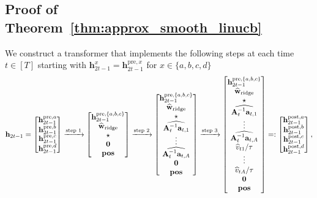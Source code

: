 \documentclass[10pt]{article}
\renewcommand{\hat}{\widehat}
\newcommand{\<}{\left\langle}
\renewcommand{\>}{\right\rangle}
\newcommand{\bzero}{{\mathbf 0}}
\newcommand{\ridge}{{\rm ridge}}
\newcommand{\pre}{{\mathrm{pre}}}
\newcommand{\posv}{{\mathbf{pos}}}
\newcommand{\post}{{\mathrm{post}}}
\newcommand{\parta}{{a}}
\newcommand{\partb}{{b}}
\newcommand{\partc}{{c}}
\newcommand{\partd}{{d}}
\newcommand{\temp}{{\tau}}
\def\bA{{\mathbf A}}
\def\ba{{\mathbf a}}
\def\bh{{\mathbf h}}
\def\bw{{\mathbf w}}
\begin{document}
\subsection{Proof of Theorem~\ref{thm:approx_smooth_linucb}}\label{sec:pf_thm:approx_smooth_linucb}
We construct a transformer that implements the following steps at each time $t\in[T]$ starting with $\bh^{x}_{2t-1}=\bh^{\pre,x}_{2t-1}$ for $x\in\{\parta,\partb,\partc,\partd\}$ 
\begin{align}
    \bh_{2t-1}=
    \begin{bmatrix}
    \bh_{2t-1}^{\pre,\parta} \\  \bh_{2t-1}^{\pre,\partb}\\  \bh_{2t-1}^{\pre,\partc}\\   \bh_{2t-1}^{\pre,\partd}
\end{bmatrix}
\xrightarrow{\text{step 1}}
   \begin{bmatrix}
    \bh_{2t-1}^{\pre,\{\parta,\partb,\partc\}} \\
        \hat\bw_{\ridge} \\ \star\\ \bzero \\\posv
\end{bmatrix}
\xrightarrow{\text{step 2}}
\begin{bmatrix}
    \bh_{2t-1}^{\pre,\{\parta,\partb,\partc\}} \\
        \hat\bw_{\ridge} \\ \star\\ \widehat{\bA_t^{-1}\ba_{t,1}}\\\vdots\\\widehat{\bA_t^{-1}\ba_{t,A}}
        \\ \bzero \\\posv
\end{bmatrix}
\xrightarrow{\text{step 3}}
\begin{bmatrix}
    \bh_{2t-1}^{\pre,\{\parta,\partb,\partc\}} \\
        \hat\bw_{\ridge} \\ \star\\ \widehat{\bA_t^{-1}\ba_{t,1}}\\\vdots\\\widehat{\bA_t^{-1}\ba_{t,A}}\\ {\hat v_{t1}}/{\temp}\\\vdots\\ {\hat v_{tA}}/{\temp}
        \\ \bzero \\\posv
\end{bmatrix}
=:
\begin{bmatrix}
    \bh_{2t-1}^{\post,\parta} \\  \bh_{2t-1}^{\post,\partb}\\  \bh_{2t-1}^{\post,\partc}\\   \bh_{2t-1}^{\post,\partd}
\end{bmatrix},\label{eq:slinucb_pipeline}
\end{align}
\end{document}
